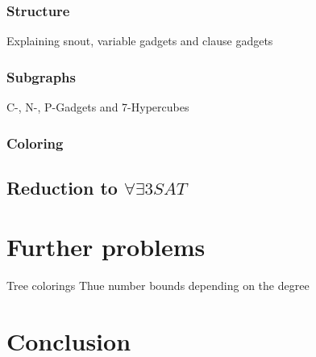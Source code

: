 \documentclass[12pt,a4paper]{article}
\begin{document}
\subsubsection{Structure}

Explaining snout, variable gadgets and clause gadgets

\subsubsection{Subgraphs}

C-, N-, P-Gadgets and 7-Hypercubes

\subsubsection{Coloring}
\subsection{Reduction to $ \forall \exists 3SAT $}
\section{Further problems}

Tree colorings
\newline
Thue number bounds depending on the degree

\section{Conclusion}

\newpage
\printbibliography
\end{document}

